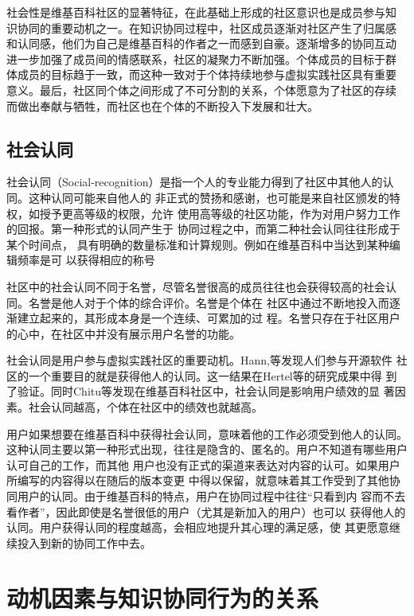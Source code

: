 社会性是维基百科社区的显著特征，在此基础上形成的社区意识也是成员参与知
识协同的重要动机之一。在知识协同过程中，社区成员逐渐对社区产生了归属感
和认同感，他们为自己是维基百科的作者之一而感到自豪。逐渐增多的协同互动
进一步加强了成员间的情感联系，社区的凝聚力不断加强。个体成员的目标于群
体成员的目标趋于一致，而这种一致对于个体持续地参与虚拟实践社区具有重要
意义。最后，社区同个体之间形成了不可分割的关系，个体愿意为了社区的存续
而做出奉献与牺牲，而社区也在个体的不断投入下发展和壮大。

\subsection{社会认同}
\label{sec:social-recognition}

社会认同（Social-recognition）是指一个人的专业能力得到了社区中其他人的认同。这种认同可能来自他人的
非正式的赞扬和感谢，也可能是来自社区颁发的特权，如授予更高等级的权限，允许
使用高等级的社区功能，作为对用户努力工作的回报。第一种形式的认同产生于
协同过程之中，而第二种社会认同往往形成于某个时间点，
具有明确的数量标准和计算规则。例如在维基百科中当达到某种编辑频率是可
以获得相应的称号

社区中的社会认同不同于名誉，尽管名誉很高的成员往往也会获得较高的社会认
同。名誉是他人对于个体的综合评价。名誉是个体在
社区中通过不断地投入而逐渐建立起来的，其形成本身是一个连续、可累加的过
程。名誉只存在于社区用户的心中，在社区中并没有展示用户名誉的功能。

社会认同是用户参与虚拟实践社区的重要动机。Hann,等发现人们参与开源软件
社区的一个重要目的就是获得他人的认同。这一结果在Hertel等的研究成果中得
到了验证。同时Chitu等发现在维基百科社区中，社会认同是影响用户绩效的显
著因素。社会认同越高，个体在社区中的绩效也就越高。

用户如果想要在维基百科中获得社会认同，意味着他的工作必须受到他人的认同。
这种认同主要以第一种形式出现，往往是隐含的、匿名的。用户不知道有哪些用户认可自己的工作，而其他
用户也没有正式的渠道来表达对内容的认可。如果用户所编写的内容得以在随后的版本变更
中得以保留，就意味着其工作受到了其他协同用户的认同。由于维基百科的特点，用户在协同过程中往往“只看到内
容而不去看作者”，因此即使是名誉很低的用户（尤其是新加入的用户）也可以
获得他人的认同。用户获得认同的程度越高，会相应地提升其心理的满足感，使
其更愿意继续投入到新的协同工作中去。

\section{动机因素与知识协同行为的关系}
  



